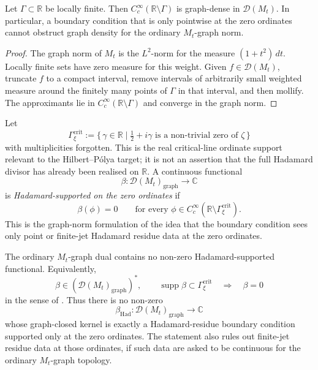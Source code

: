 \begin{lemma}
\label{v4-arith:w9-r4:lem:point-conditions-graph-invisible}
\ClaimStatusProvedHere Let \(\Gamma\subset\mathbb R\) be locally
finite. Then \(C_c^\infty(\mathbb R\setminus\Gamma)\) is graph-dense
in \(\mathcal{D}(M_t)\). In particular, a boundary condition that is
only pointwise at the zero ordinates cannot obstruct graph density for
the ordinary \(M_t\)-graph norm.
\end{lemma}

\begin{proof}
The graph norm of \(M_t\) is the \(L^2\)-norm for the measure
\((1+t^2)\,dt\). Locally finite sets have zero measure for this
weight. Given \(f\in\mathcal{D}(M_t)\), truncate \(f\) to a compact
interval, remove intervals of arbitrarily small weighted measure
around the finitely many points of \(\Gamma\) in that interval, and
then mollify. The approximants lie in
\(C_c^\infty(\mathbb R\setminus\Gamma)\) and converge in the graph
norm.
\end{proof}

\begin{definition}
\label{v4-arith:w9-r4:def:hadamard-supported-graph-functional}
\ClaimStatusDefinitional Let
\[
\Gamma_{\xi}^{\mathrm{crit}}:=\{\,\gamma\in\mathbb R\mid
\tfrac12+i\gamma\text{ is a non-trivial zero of }\zeta\,\}
\]
with multiplicities forgotten. This is the real critical-line
ordinate support relevant to the Hilbert--P\'olya target; it is not an
assertion that the full Hadamard divisor has already been realised on
\(\mathbb R\). A continuous functional
\[
\beta\colon \mathcal{D}(M_t)_{\mathrm{graph}}\longrightarrow\mathbb C
\]
is \emph{Hadamard-supported on the zero ordinates} if
\[
\beta(\phi)=0
\qquad
\text{for every }
\phi\in C_c^\infty(\mathbb R\setminus\Gamma_{\xi}^{\mathrm{crit}}).
\]
This is the graph-norm formulation of the idea that the boundary
condition sees only point or finite-jet Hadamard residue data at the
zero ordinates.
\end{definition}

\begin{theorem}
\label{v4-arith:w9-r4:thm:no-hadamard-graph-dual}
\ClaimStatusProvedHere The ordinary \(M_t\)-graph dual contains no
non-zero Hadamard-supported functional. Equivalently,
\[
\beta\in(\mathcal{D}(M_t)_{\mathrm{graph}})^{*},
\qquad
\operatorname{supp}\beta\subset\Gamma_{\xi}^{\mathrm{crit}}
\quad\Longrightarrow\quad
\beta=0
\]
in the sense of
.
Thus there is no non-zero
\[
\beta_{\mathrm{Had}}\colon \mathcal{D}(M_t)_{\mathrm{graph}}\to\mathbb C
\]
whose graph-closed kernel is exactly a Hadamard-residue boundary
condition supported only at the zero ordinates. The statement also
rules out finite-jet residue data at those ordinates, if such data are
asked to be continuous for the ordinary \(M_t\)-graph topology.
\end{theorem}

